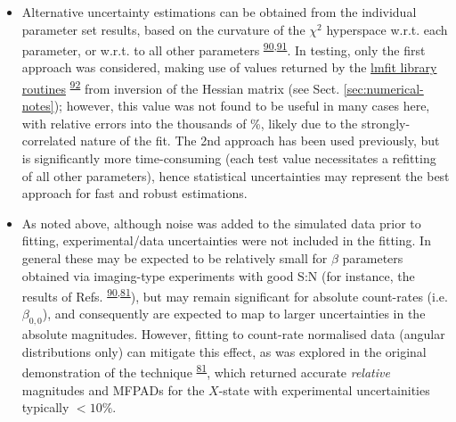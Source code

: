 \documentclass[10pt]{article}
\begin{document}
\begin{itemize}
\item Alternative uncertainty estimations can be obtained from the individual parameter set results, based on the curvature of the $\chi^2$ hyperspace w.r.t. each parameter, or w.r.t. to all other parameters \textsuperscript{\hyperref[csl:90]{90},\hyperref[csl:91]{91}}. In testing, only the first approach was considered, making use of values returned by the \href{https://lmfit.github.io/lmfit-py/fitting.html#uncertainties-in-variable-parameters-and-their-correlations}{lmfit library routines} \textsuperscript{\hyperref[csl:92]{92}} from inversion of the Hessian matrix (see Sect. \ref{sec:numerical-notes}); however, this value was not found to be useful in many cases here, with relative errors into the thousands of \%, likely due to the strongly-correlated nature of the fit. The 2nd approach has been used previously, but is significantly more time-consuming (each test value necessitates a refitting of all other parameters), hence statistical uncertainties may represent the best approach for fast and robust estimations.
\item As noted above, although noise was added to the simulated data prior to fitting, experimental/data uncertainties were not included in the fitting. In general these may be expected to be relatively small for $\beta$ parameters obtained via imaging-type experiments with good S:N (for instance, the results of Refs. \textsuperscript{\hyperref[csl:90]{90},\hyperref[csl:81]{81}}), but may remain significant for absolute count-rates (i.e. $\beta_{0,0}$), and consequently are expected to map to larger uncertainties in the absolute magnitudes. However, fitting to count-rate normalised data (angular distributions only) can mitigate this effect, as was explored in the original demonstration of the technique \textsuperscript{\hyperref[csl:81]{81}}, which returned accurate \textit{relative} magnitudes and MFPADs for the $X$-state with experimental uncertainities typically $<10\%$.
\end{itemize}




\end{document}
